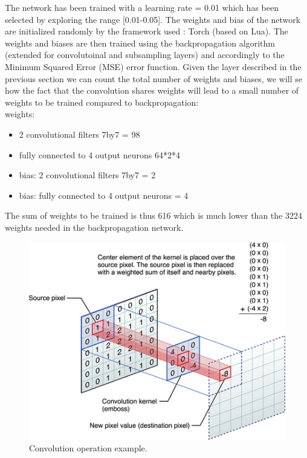 \documentclass[a4paper, 10pt, conference]{ieeeconf}      %
\begin{document}
The network has been trained with a learning
rate = 0.01 which has been selected by exploring the range [0.01-0.05]. The weights and bias of the
network are initialized randomly by the framework
used : Torch\cite{torch} (based on Lua\cite{Lua}). The weights and biases are
then trained using the backpropagation algorithm
(extended for convolutoinal and subsampling layers)
and accordingly to the Minimum Squared
Error (MSE) error function.
Given the layer described in the previous section
we can count the total number of weights and
biases, we will se how the fact that the convolution
shares weights will lead to a small number of
weights to be trained compared to backpropagation:\\
weights:
\begin{itemize}
	\item 2 convolutional filters 7by7 = 98
	\item fully connected to 4 output neurons 64*2*4
	\item bias: 2 convolutional filters 7by7 = 2
	\item bias: fully connected to 4 output neurons = 4
\end{itemize}
The sum of weights to be trained is thus 616
which is much lower than the 3224 weights needed
in the backpropagation network.

\begin{figure}[thpb]
	\centering
	\includegraphics[scale=0.45]{conv.jpg}
	\caption{Convolution operation example.}
	\label{conv}
\end{figure}
\end{document}
